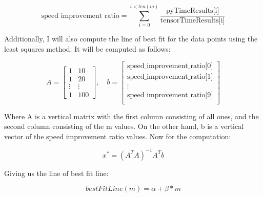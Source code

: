 \documentclass[12pt]{article}
\begin{document}
\begin{equation*}
    \text{speed improvement ratio} = \sum_{i = 0}^{i < len(m)} \frac{\text{pyTimeResults[i]}}{\text{tensorTimeResults[i]}}
\end{equation*}

\noindent Additionally, I will also compute the line of best fit for the data points using the least squares method.
It will be computed as follows:

\begin{equation*}
    A = 
    \begin{bmatrix}
        1 & 10 \\
        1 & 20 \\
        \vdots & \vdots \\
        1 & 100
    \end{bmatrix},\quad
    b =
    \begin{bmatrix}
        \text{speed\_improvement\_ratio[0]} \\
        \text{speed\_improvement\_ratio[1]} \\
        \vdots \\
        \text{speed\_improvement\_ratio[9]} \\
    \end{bmatrix}
\end{equation*}

\noindent Where A is a vertical matrix with the first column consisting of all ones, and the second column consisting of the m values.
On the other hand, b is a vertical vector of the speed improvement ratio values. Now for the computation:

\begin{equation*}
    x^* = (A^T A)^{-1} A^T b
\end{equation*}

\noindent Giving us the line of best fit line:

\begin{equation*}
    bestFitLine(m) = \alpha + \beta * m
\end{equation*}

\newpage
\end{document}
